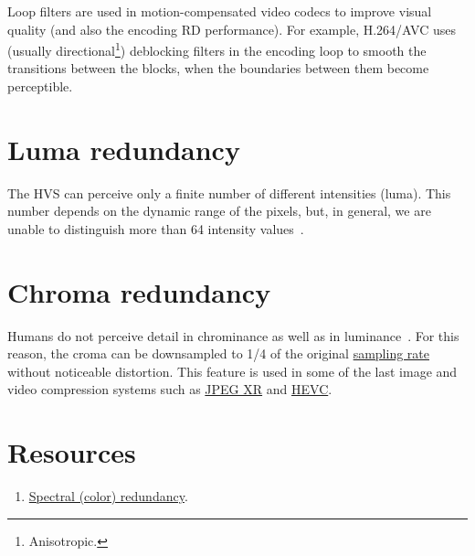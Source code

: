 Loop filters are used in motion-compensated video codecs to improve visual quality (and also the encoding RD performance). For
example, H.264/AVC uses (usually directional\footnote{Anisotropic.})
deblocking filters in the encoding loop to smooth the transitions
between the blocks, when the boundaries between them become
perceptible.

\section{Luma redundancy}

The HVS can perceive only a finite number of different intensities
(luma). This number depends on the dynamic range of the pixels, but, in
general, we are unable to distinguish more than 64 intensity
values~\cite{vruiz__visual_redundancy}.

\section{Chroma redundancy}

Humans do not perceive detail in chrominance as well as in luminance~\cite{burger2016digital}. For this reason, the
croma can be downsampled to 1/4 of the original
\href{https://en.wikipedia.org/wiki/Sampling_(signal_processing)}{sampling
  rate} without noticeable distortion. This feature is used in some of
the last image and video compression systems such as
\href{https://en.wikipedia.org/wiki/JPEG_XR#Description}{JPEG XR} and
\href{https://en.wikipedia.org/wiki/High_Efficiency_Video_Coding#Video_coding_layer}{HEVC}.

\section{Resources}
\begin{enumerate}
\item \href{https://github.com/vicente-gonzalez-ruiz/color_transforms/blob/main/docs/color_redundancy.ipynb}{Spectral
    (color) redundancy}.
\end{enumerate}

